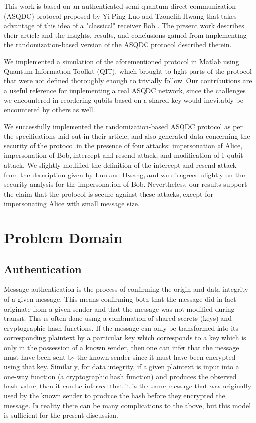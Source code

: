 \documentclass[conference,compsoc]{IEEEtran}
\begin{document}
This work is based on an authenticated semi-quantum direct communication (ASQDC) protocol
proposed by Yi-Ping Luo and Tzonelih Hwang that takes advantage of this idea
of a "classical" receiver Bob \cite{LuoHwang}.
The present work describes their article and the insights,
results, and conclusions gained from implementing the randomization-based version
of the ASQDC protocol described therein.

We implemented a simulation of the aforementioned protocol in Matlab
using Quantum Information Toolkit (QIT), which brought to light parts of the
protocol that were not defined thoroughly enough to trivially follow.
Our contributions are a useful reference for implementing a real ASQDC
network, since the challenges we encountered in reordering qubits based
on a shared key would inevitably be encountered by others as well.

We successfully implemented the randomization-based ASQDC
protocol as per the specifications laid out in their article,
and also generated data concerning the security of the protocol
in the presence of four attacks: impersonation of Alice, impersonation
of Bob, intercept-and-resend attack, and modification of 1-qubit attack.
We slightly modified the definition of the intercept-and-resend attack
from the description given by Luo and Hwang, and we disagreed slightly on the
security analysis for the impersonation of Bob. Nevertheless, our
results support the claim that the protocol is secure against these
attacks, except for impersonating Alice with small message size.

\section{Problem Domain}

\subsection{Authentication}

Message authentication is the process of confirming the origin and
data integrity of a given message. This means confirming both that the
message did in fact originate from a given sender and that the message
was not modified during transit. This is often done using a combination of
shared secrets (keys) and cryptographic hash functions. If the message
can only be transformed into its corresponding plaintext by a particular key
which corresponds to a key which is only in the possession
of a known sender, then one can infer that the message must have been
sent by the known sender since it must have been encrypted using that
key. Similarly, for data integrity, if a given plaintext is input
into a one-way function (a cryptographic hash function) and produces
the observed hash value, then it can be inferred that it is the same
message that was originally used by the known sender to produce the
hash before they encrypted the message. In reality there
can be many complications to the above, but this model is sufficient
for the present discussion.
\end{document}
